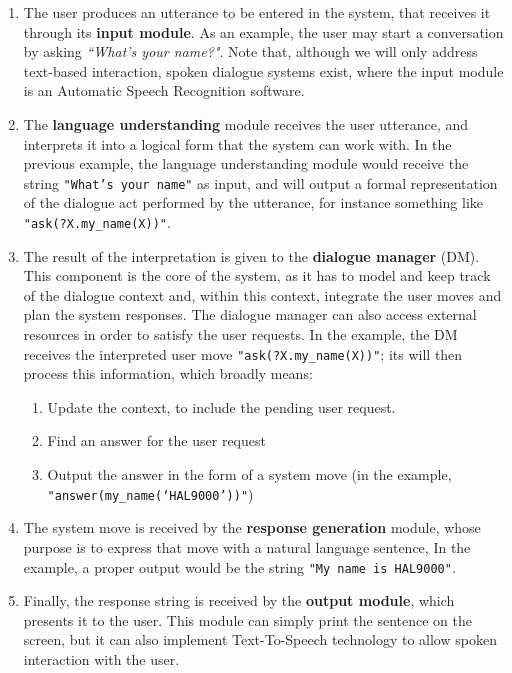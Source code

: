  \begin{enumerate}
	\item The user produces an utterance to be entered in the system, that receives it through its \textbf{input module}. As an example, the user may start a conversation by asking \textit{``What's your name?"}. Note that, although we will only address text-based interaction, spoken dialogue systems exist, where the input module is an Automatic Speech Recognition software.
	\item The \textbf{language understanding} module receives the user utterance, and interprets it into a logical form that the system can work with. In the previous example, the language understanding module would receive the string \texttt{"What's your name"} as input, and will output a formal representation of the dialogue act performed by the utterance, for instance something like \texttt{"ask(?X.my\_name(X))"}.
	\item The result of the interpretation is given to the \textbf{dialogue manager} (DM). This component is the core of the system, as it has to model and keep track of the dialogue context and, within this context, integrate the user moves and plan the system responses. The dialogue manager can also access external resources in order to satisfy the user requests. In the example, the DM receives the interpreted user move \texttt{"ask(?X.my\_name(X))"}; its will then process this information, which broadly means:
	\begin{enumerate}
		\item Update the context, to include the pending user request.
		\item Find an answer for the user request
		\item Output the answer in the form of a system move (in the example, \\ \texttt{"answer(my\_name(`HAL9000'))"})
	\end{enumerate}
	\item The system move is received by the \textbf{response generation} module, whose purpose is to express that move with a natural language sentence, In the example, a proper output would be the string \texttt{"My name is HAL9000"}.
	\item Finally, the response string is received by the \textbf{output module}, which presents it to the user. This module can simply print the sentence on the screen, but it can also implement Text-To-Speech technology to allow spoken interaction with the user.
\end{enumerate}

